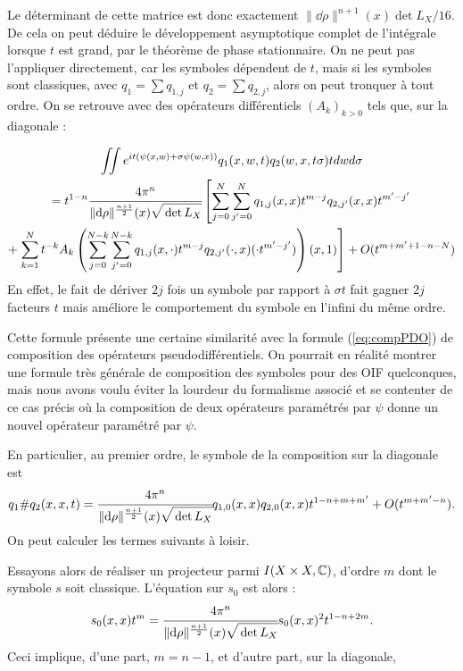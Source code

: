 Le déterminant de cette matrice est donc exactement $\|\dd\rho\|^{n+1}(x)\det L_X/16$. De cela on peut déduire le développement asymptotique complet de l'intégrale lorsque $t$ est grand, par le théorème de phase stationnaire. On ne peut pas l'appliquer directement, car les symboles dépendent de $t$, mais si les symboles sont classiques, avec $q_1 = \sum q_{1,j}$ et $q_2 = \sum q_{2,j}$, alors on peut tronquer à tout ordre. On se retrouve avec des opérateurs différentiels $(A_k)_{k >0}$ tels que, sur la diagonale :

\begin{multline*}
  \iint e^{it(\psi(x,w)+\sigma \psi(w,x))}q_1(x,w,t)q_2(w,x,t\sigma)tdwd\sigma \\= t^{1-n}\cfrac{4\pi^n}{\|\dd\rho\|^{\frac{n+1}{2}}(x)\sqrt{\vphantom{\hat{A}}\det L_X}}\left[\sum_{j=0}^{N}\sum_{j'=0}^{N} q_{1,j}(x,x)t^{m-j}q_{2,j'}(x,x)t^{m'-j'}\right. \\+ \left.\sum_{k=1}^{N}t^{-k}A_k\left(\sum_{j=0}^{N-k}\sum_{j'=0}^{N-k} q_{1,j}(x,\cdot)t^{m-j}q_{2,j'}(\cdot,x)(\cdot t^{m'-j'})\right)(x,1)\right] + O(t^{m+m'+1-n-N})
\end{multline*}
En effet, le fait de dériver $2j$ fois un symbole par rapport à $\sigma t$ fait gagner $2j$ facteurs $t$ mais améliore le comportement du symbole en l'infini du même ordre.

\begin{rem}
Cette formule présente une certaine similarité avec la formule (\ref{eq:compPDO}) de composition des opérateurs pseudodifférentiels. On pourrait en réalité montrer une formule très générale de composition des symboles pour des OIF quelconques, mais nous avons voulu éviter la lourdeur du formalisme associé et se contenter de ce cas précis où la composition de deux opérateurs paramétrés par $\psi$ donne un nouvel opérateur paramétré par $\psi$.
\end{rem}

En particulier, au premier ordre, le symbole de la composition sur la diagonale est
\begin{equation*}
  q_1\#q_2(x,x,t) = \cfrac{4\pi^n}{\|\dd\rho\|^{\frac{n+1}{2}}(x)\sqrt{\vphantom{\hat{A}}\det L_X}}q_{1,0}(x,x)q_{2,0}(x,x)t^{1-n+m+m'} + O(t^{m+m'-n}).
\end{equation*}
On peut calculer les termes suivants à loisir.

Essayons alors de réaliser un projecteur parmi $I(X\times X,\mathbb{C})$, d'ordre $m$ dont le symbole $s$ soit classique. L'équation sur $s_0$ est alors :
\begin{equation*}
  s_0(x,x)t^m = \cfrac{4\pi^n}{\|\dd\rho\|^{\frac{n+1}{2}}(x)\sqrt{\vphantom{\hat{A}}\det L_X}}s_0(x,x)^2t^{1-n+2m}.
\end{equation*}
Ceci implique, d'une part, $m=n-1$, et d'autre part, sur la diagonale,


